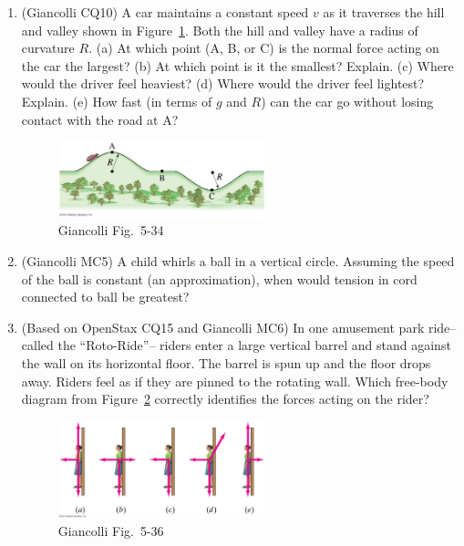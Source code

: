 \documentclass[10pt,twocolumn]{exam}
\begin{document}
\begin{questions}
\begin{enumerate}[resume*]
  \vs \pagebreak

  \item (Giancolli CQ10) A car maintains a constant speed $v$ as it traverses the hill and valley shown in Figure~\ref{G5-34}. Both the hill and valley have a radius of curvature $R$. (a) At which point (A, B, or C) is the normal force acting on the car the largest? (b) At which point is it the smallest? Explain. (c) Where would the driver feel heaviest? (d) Where would the driver feel lightest? Explain. (e) How fast (in terms of $g$ and $R$) can the car go without losing contact with the road at A?
  
    \begin{figure}[h]
      \centering
      \includegraphics[width=6cm]{05_34_Figure.jpg}
      \caption{Giancolli Fig.~5-34}
      \label{G5-34}
    \end{figure}

  \item (Giancolli MC5) A child whirls a ball in a vertical circle. Assuming the speed of the ball is constant (an approximation), when would tension in cord connected to ball be greatest?
  \item (Based on OpenStax CQ15 and Giancolli MC6) In one amusement park ride--called the ``Roto-Ride''-- riders enter a large vertical barrel and stand against the wall on its horizontal floor. The barrel is spun up and the floor drops away. Riders feel as if they are pinned to the rotating wall.  Which free-body diagram from Figure~\ref{G5-36} correctly identifies the forces acting on the rider?
    \begin{figure}[h]
      \centering
      \includegraphics[width=6cm]{05_36_Figure.jpg}
      \caption{Giancolli Fig.~5-36}
      \label{G5-36}
    \end{figure}


\end{enumerate}
\end{questions}
\end{document}
